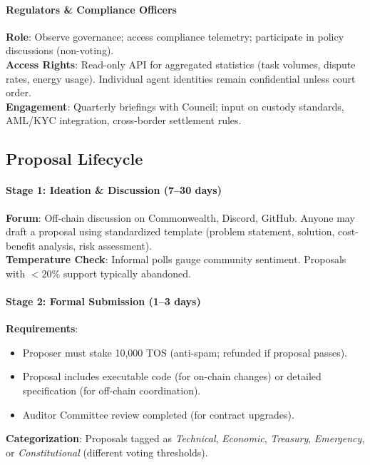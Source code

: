 \documentclass[11pt]{article}
\begin{document}
\paragraph{Regulators \& Compliance Officers}
\textbf{Role}: Observe governance; access compliance telemetry; participate in policy discussions (non-voting).\\
\textbf{Access Rights}: Read-only API for aggregated statistics (task volumes, dispute rates, energy usage). Individual agent identities remain confidential unless court order.\\
\textbf{Engagement}: Quarterly briefings with Council; input on custody standards, AML/KYC integration, cross-border settlement rules.

\subsection{Proposal Lifecycle}

\paragraph{Stage 1: Ideation \& Discussion (7--30 days)}
\textbf{Forum}: Off-chain discussion on Commonwealth, Discord, GitHub. Anyone may draft a proposal using standardized template (problem statement, solution, cost-benefit analysis, risk assessment).\\
\textbf{Temperature Check}: Informal polls gauge community sentiment. Proposals with $<20\%$ support typically abandoned.

\paragraph{Stage 2: Formal Submission (1--3 days)}
\textbf{Requirements}:
\begin{itemize}[noitemsep]
  \item Proposer must stake 10,000 TOS (anti-spam; refunded if proposal passes).
  \item Proposal includes executable code (for on-chain changes) or detailed specification (for off-chain coordination).
  \item Auditor Committee review completed (for contract upgrades).
\end{itemize}
\textbf{Categorization}: Proposals tagged as \emph{Technical}, \emph{Economic}, \emph{Treasury}, \emph{Emergency}, or \emph{Constitutional} (different voting thresholds).
\end{document}
